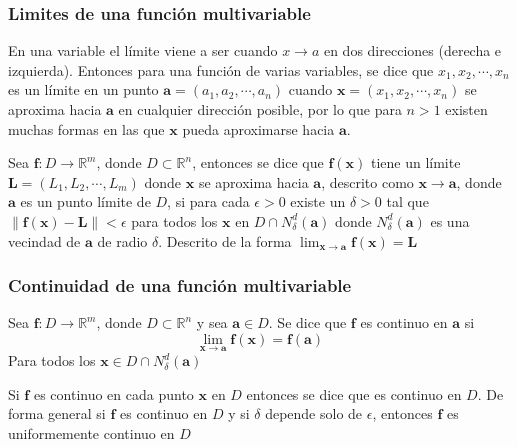 \subsubsection{Limites de una función multivariable}
En una variable el límite viene a ser cuando $x \rightarrow a$ en dos direcciones (derecha e izquierda). Entonces para una función de varias variables, se dice que ${x}_{1}, {x}_{2}, \cdots , {x}_{n}$ es un límite en un punto $\mathbf{a}=({a}_{1},{a}_{2}, \cdots , {a}_{n})$ cuando $\mathbf{x}=({x}_{1},{x}_{2}, \cdots , {x}_{n})$ se aproxima hacia $\mathbf{a}$ en cualquier dirección posible, por lo que para $n > 1$ existen muchas formas en las que $\mathbf{x}$ pueda aproximarse hacia $\mathbf{a}$.
\begin{definition}
	Sea $\mathbf{f}: D \rightarrow \mathbb{R}^m$, donde $D \subset \mathbb{R}^n$, entonces se dice que $\mathbf{f(x)}$ tiene un límite $\mathbf{L}=({L}_{1},{L}_{2}, \cdots , {L}_{m})$ donde $\mathbf{x}$ se aproxima hacia $\mathbf{a}$, descrito como $\mathbf{x} \rightarrow \mathbf{a}$, donde $\mathbf{a}$ es un punto límite de $D$, si para cada $\epsilon > 0$ existe un $\delta > 0$ tal que $\| \mathbf{f(x) - L} \| < \epsilon$ para todos los $\mathbf{x}$ en $D \cap {N}_{\delta}^{d}(\mathbf{a})$ donde ${N}_{\delta}^{d}(\mathbf{a})$ es una vecindad de $\mathbf{a}$ de radio $\delta$. Descrito de la forma $\lim_{\mathbf{x} \to \mathbf{a}} \mathbf{f(x) = L}$
\end{definition}
\subsubsection{Continuidad de una función multivariable}
\begin{definition}
	Sea $\mathbf{f}: D \rightarrow \mathbb{R}^m$, donde $D \subset \mathbb{R}^n$ y sea $\mathbf{a} \in D$. Se dice que $\mathbf{f}$ es continuo en $\mathbf{a}$ si
	$$\lim_{\mathbf{x} \to \mathbf{a}} \mathbf{f(x) = f(a)}$$
	Para todos los $\mathbf{x} \in D \cap {N}_{\delta}^{d}(\mathbf{a})$
\end{definition}
Si $\mathbf{f}$ es continuo en cada punto $\mathbf{x}$ en $D$ entonces se dice que es continuo en $D$. De forma general si $\mathbf{f}$ es continuo en $D$ y si $\delta$ depende solo de $\epsilon$, entonces $\mathbf{f}$ es uniformemente continuo en $D$
